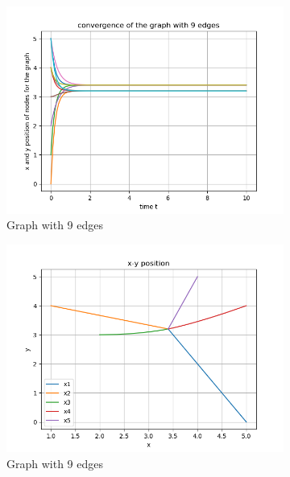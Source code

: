 \documentclass{article}
\begin{document}
\begin{problem}
\begin{figure}
\begin{subfigure}{0.4\textwidth}
            \includegraphics[width=\textwidth]{./img/Figure_9.png}
            \caption{Graph with 9 edges}
        \end{subfigure}
        \begin{subfigure}{0.4\textwidth}
            \includegraphics[width=\textwidth]{./img/Figure_10.png}
            \caption{Graph with 9 edges}
        \end{subfigure}
        \begin{subfigure}{0.4\textwidth}

\end{subfigure}
\end{figure}
\end{problem}
\end{document}
